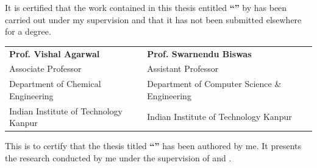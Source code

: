 \documentclass[11pt, a4paper, oneside]{Thesis} %
\begin{document}
\begin{minipage}{1.03\textwidth}
    
    It is certified that the work contained in this thesis entitled \textbf{\enquote{\ttitle}} by \textbf{\authornames} has been carried out under my supervision and that it has not been submitted elsewhere for a degree.
        
\end{minipage}

\vspace{25mm}

\begin{tabular}{@{}p{}@{}p{}@{}}
    \textbf{Prof. Vishal Agarwal} & \textbf{Prof. Swarnendu Biswas} \\
    Associate Professor & Assistant Professor \\
    Department of Chemical Engineering & Department of Computer Science \& Engineering \\
    Indian Institute of Technology Kanpur & Indian Institute of Technology Kanpur \\
\end{tabular}

\vfill
\clearpage %

This is to certify that the thesis titled \textbf{``\ttitle''} has been authored by me. It presents the research conducted by me under the supervision of \textbf{\supnameA} and \textbf{\supnameB}.\par
\end{document}
